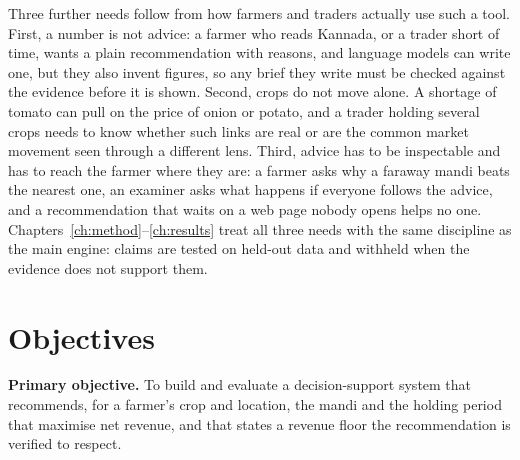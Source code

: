 Three further needs follow from how farmers and traders actually use such a tool. First, a number is not advice: a farmer who reads Kannada, or a trader short of time, wants a plain recommendation with reasons, and language models can write one, but they also invent figures, so any brief they write must be checked against the evidence before it is shown. Second, crops do not move alone. A shortage of tomato can pull on the price of onion or potato, and a trader holding several crops needs to know whether such links are real or are the common market movement seen through a different lens. Third, advice has to be inspectable and has to reach the farmer where they are: a farmer asks why a faraway mandi beats the nearest one, an examiner asks what happens if everyone follows the advice, and a recommendation that waits on a web page nobody opens helps no one. Chapters~\ref{ch:method}--\ref{ch:results} treat all three needs with the same discipline as the main engine: claims are tested on held-out data and withheld when the evidence does not support them.

\section{Objectives}
\label{sec:objectives}

\noindent \textbf{Primary objective.} To build and evaluate a decision-support system that recommends, for a farmer's crop and location, the mandi and the holding period that maximise net revenue, and that states a revenue floor the recommendation is verified to respect.

